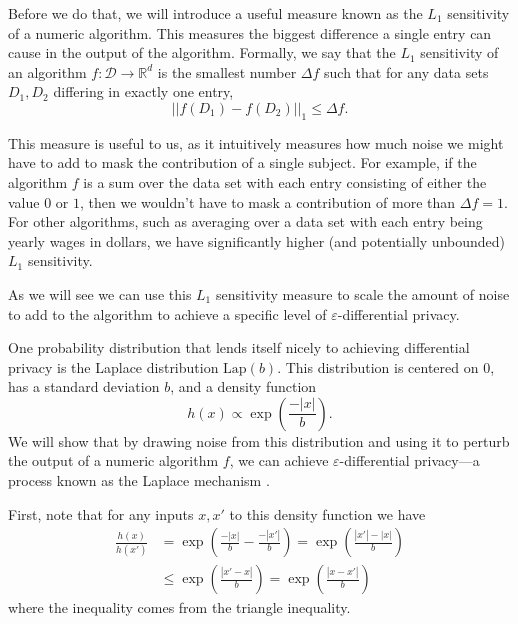 \documentclass[a4paper,12pt]{article}
\newcommand{\fancy}{\mathcal}
\renewcommand{\epsilon}{\varepsilon}
\begin{document}
Before we do that, we will introduce a useful measure known as the $L_1$ sensitivity of a numeric algorithm. This measures the biggest difference a single entry can cause in the output of the algorithm. Formally, we say that the $L_1$ sensitivity of an algorithm $f : \fancy{D} \to \mathbb{R}^d$ is the smallest number $\Delta f$ such that for any data sets $D_1,D_2$ differing in exactly one entry,
\begin{equation}\label{eq:L1_sensitivity}
    ||f(D_1)-f(D_2)||_1 \leq \Delta f.
\end{equation}

This measure is useful to us, as it intuitively measures how much noise we might have to add to mask the contribution of a single subject. For example, if the algorithm $f$ is a sum over the data set with each entry consisting of either the value $0$ or $1$, then we wouldn't have to mask a contribution of more than $\Delta f = 1$. For other algorithms, such as averaging over a data set with each entry being yearly wages in dollars, we have significantly higher (and potentially unbounded) $L_1$ sensitivity.

As we will see we can use this $L_1$ sensitivity measure to scale the amount of noise to add to the algorithm to achieve a specific level of $\epsilon$-differential privacy.

One probability distribution that lends itself nicely to achieving differential privacy is the Laplace distribution $\text{Lap}(b)$. This distribution is centered on 0, has a standard deviation $b$, and a density function
\begin{equation*}
    h(x)\propto \exp\left(\frac{-|x|}{b}\right).
\end{equation*}
We will show that by drawing noise from this distribution and using it to perturb the output of a numeric algorithm $f$, we can achieve $\epsilon$-differential privacy---a process known as the Laplace mechanism \cite{dworketal2006}.

First, note that for any inputs $x,x'$ to this density function we have
\begin{align*}
    \frac{h(x)}{h(x')} &= \exp\left(\frac{-|x|}{b}-\frac{-|x'|}{b}\right) = \exp\left(\frac{|x'|-|x|}{b} \right) \\
        &\leq \exp\left( \frac{|x'-x|}{b} \right) = \exp\left( \frac{|x-x'|}{b} \right)
\end{align*}
where the inequality comes from the triangle inequality.
\end{document}
